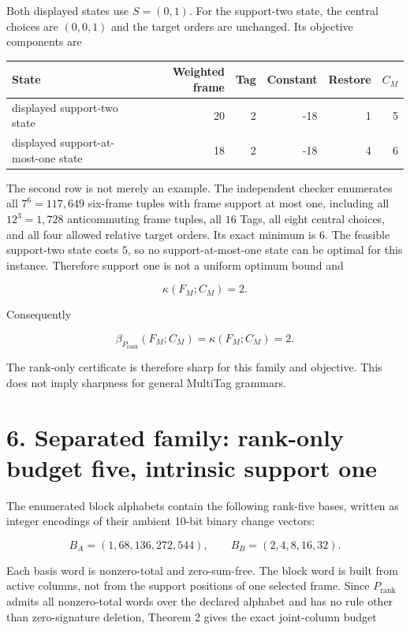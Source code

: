 \documentclass[11pt]{article}
\begin{document}
Both displayed states use \(S=(0,1)\). For the support-two state, the central choices are \((0,0,1)\) and the target orders are unchanged. Its objective components are

\begin{longtable}[]{@{}lrrrrr@{}}
\toprule\noalign{}
State & Weighted frame & Tag & Constant & Restore & \(C_M\) \\
\midrule\noalign{}
\endhead
\bottomrule\noalign{}
\endlastfoot
displayed support-two state & 20 & 2 & -18 & 1 & 5 \\
displayed support-at-most-one state & 18 & 2 & -18 & 4 & 6 \\
\end{longtable}

The second row is not merely an example. The independent checker enumerates all \(7^6=117{,}649\) six-frame tuples with frame support at most one, including all \(12^3=1{,}728\) anticommuting frame tuples, all \(16\) Tags, all eight central choices, and all four allowed relative target orders. Its exact minimum is \(6\). The feasible support-two state costs \(5\), so no support-at-most-one state can be optimal for this instance. Therefore support one is not a uniform optimum bound and

\[
\kappa(F_M;C_M)=2.
\]

Consequently

\[
\beta_{P_{\mathrm{rank}}}(F_M;C_M)
=
\kappa(F_M;C_M)
=2.
\]

The rank-only certificate is therefore sharp for this family and objective. This does not imply sharpness for general MultiTag grammars.

\hypertarget{separated-family-rank-only-budget-five-intrinsic-support-one}{%
\section*{6. Separated family: rank-only budget five, intrinsic support one}\label{separated-family-rank-only-budget-five-intrinsic-support-one}}

The enumerated block alphabets contain the following rank-five bases, written as integer encodings of their ambient 10-bit binary change vectors:

\[
B_A=(1,68,136,272,544),
\qquad
B_B=(2,4,8,16,32).
\]

Each basis word is nonzero-total and zero-sum-free. The block word is built from active columns, not from the support positions of one selected frame. Since \(P_{\mathrm{rank}}\) admits all nonzero-total words over the declared alphabet and has no rule other than zero-signature deletion, Theorem 2 gives the exact joint-column budget
\end{document}
